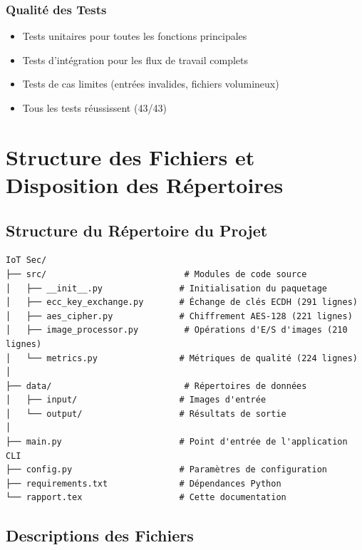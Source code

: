 \documentclass[12pt,a4paper]{report}
\begin{document}
\subsection{Qualité des Tests}

\begin{itemize}
    \item Tests unitaires pour toutes les fonctions principales
    \item Tests d'intégration pour les flux de travail complets
    \item Tests de cas limites (entrées invalides, fichiers volumineux)
    \item Tous les tests réussissent (43/43)
\end{itemize}

\chapter{Structure des Fichiers et Disposition des Répertoires}

\section{Structure du Répertoire du Projet}

\begin{lstlisting}[caption=Disposition du Répertoire du Projet]
IoT Sec/
├── src/                           # Modules de code source
│   ├── __init__.py               # Initialisation du paquetage
│   ├── ecc_key_exchange.py       # Échange de clés ECDH (291 lignes)
│   ├── aes_cipher.py             # Chiffrement AES-128 (221 lignes)
│   ├── image_processor.py         # Opérations d'E/S d'images (210 lignes)
│   └── metrics.py                # Métriques de qualité (224 lignes)
│
├── data/                          # Répertoires de données
│   ├── input/                    # Images d'entrée
│   └── output/                   # Résultats de sortie
│
├── main.py                       # Point d'entrée de l'application CLI
├── config.py                     # Paramètres de configuration
├── requirements.txt              # Dépendances Python
└── rapport.tex                   # Cette documentation
\end{lstlisting}

\section{Descriptions des Fichiers}
\end{document}
